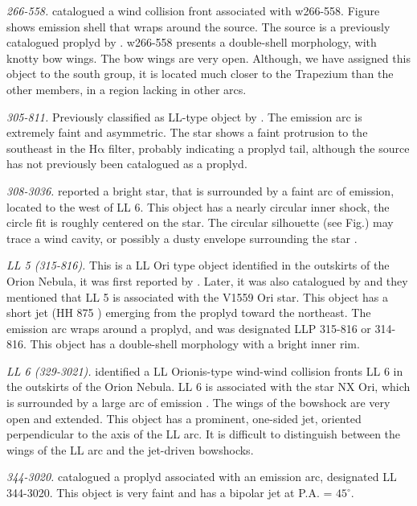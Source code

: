 \documentclass[iop, apj]{emulateapj}
\newcommand\ha{\ensuremath{\mathrm{H\alpha}}}
\begin{document}
\textit{266-558.} \citet{Bally:2000a} catalogued a wind collision front associated with w266-558. Figure shows emission shell that wraps around the source. The source is a previously catalogued proplyd by \citet{Ricci:2008a}. w266-558 presents a double-shell morphology, with knotty bow wings. The bow wings are very open. Although, we have assigned this object to the south group, it is located much closer to the Trapezium than the other members, in a region lacking in other arcs.

\textit{305-811.} Previously classified as LL-type object by \citet{Bally:2006a}. The emission arc is extremely faint and asymmetric. The star shows  a faint protrusion to the southeast in the \ha{} filter, probably indicating a proplyd tail, although the source has not previously been catalogued as a proplyd.    

\textit{308-3036.} \citet{Bally:2006a} reported a bright star, that is surrounded by a faint arc of emission, located to the west of LL 6. This object has a nearly circular inner shock, the circle fit is roughly centered on the star. The circular silhouette (see Fig.) may trace a wind cavity, or possibly a dusty envelope surrounding the star \citep{Bally:2006a}.       

\textit{LL 5 (315-816).} This is a LL Ori type object identified in the outskirts of the Orion Nebula, it was first reported by \citet{Bally:2001a}. Later, it was also catalogued by \citet{Bally:2006a} and they mentioned that LL 5 is associated with the  V1559 Ori star. This object has a short jet (HH 875 \citealp{Bally:2006a}) emerging from the proplyd toward the northeast.  The emission arc wraps around a proplyd, and was designated LLP 315-816 or 314-816. This object has a double-shell morphology with a bright inner rim.
       
\textit{LL 6 (329-3021).} \citep{Bally:2001a} identified a LL Orionis-type wind-wind collision fronts LL 6 in the outskirts of the Orion Nebula. LL 6 is associated with the star NX Ori, which is surrounded by a large arc of emission \citep{Bally:2006a}. The wings of the bowshock are very open and extended. This object has a prominent, one-sided jet, oriented perpendicular to the axis of the LL arc. It is difficult to distinguish between the wings of the LL arc and the jet-driven bowshocks.    

\textit{344-3020.} \citet{Bally:2006a} catalogued a proplyd associated with an emission arc, designated LL 344-3020. This object is very faint and has a bipolar jet at P.A. = $45^{\circ}$.     
\end{document}

